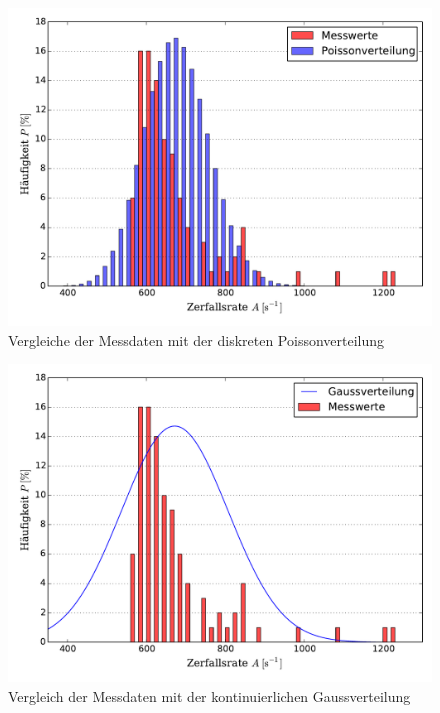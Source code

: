 	\begin{figure}[!h]
		\centering
		\includegraphics[scale=0.7]{Grafiken/VergleichPoisson.pdf}
		\caption{Vergleiche der Messdaten mit der diskreten Poissonverteilung}
		\label{fig:Messdaten_III_Poisson}
	\end{figure}
	
	\begin{figure}[!h]
		\centering
		\includegraphics[scale=0.7]{Grafiken/VergleichGauss.pdf}
		\caption{Vergleich der Messdaten mit der kontinuierlichen Gaussverteilung}
		\label{fig:Messdaten_III_Gauss}
	\end{figure}
